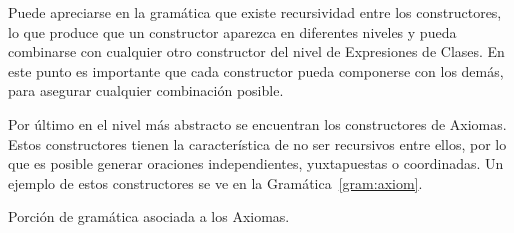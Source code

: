 Puede apreciarse en la gramática que existe recursividad entre los constructores, lo que produce que un constructor aparezca en diferentes niveles y pueda combinarse con cualquier otro constructor del nivel de Expresiones de Clases. En este punto es importante que cada constructor pueda componerse con los demás, para asegurar cualquier combinación posible.

Por último en el nivel más abstracto se encuentran los constructores de Axiomas. Estos constructores tienen la característica de no ser recursivos entre ellos, por lo que es posible generar oraciones independientes, yuxtapuestas o coordinadas. Un ejemplo de estos constructores se ve en la Gramática~\ref{gram:axiom}.

\begin{GrammarEnv}
\begin{grammar}
[(colon){$\rightarrow$}]
[(semicolon)$|$]
[(comma){}]
[(period){\vspace{0.3cm} \\}]
[(quote){\begin{bf}}{\end{bf}}]
[(nonterminal){$<$}{$>$}]
\end{grammar}
\caption{Porción de gramática asociada a los Axiomas.}\label{gram:axiom}
\end{GrammarEnv}

